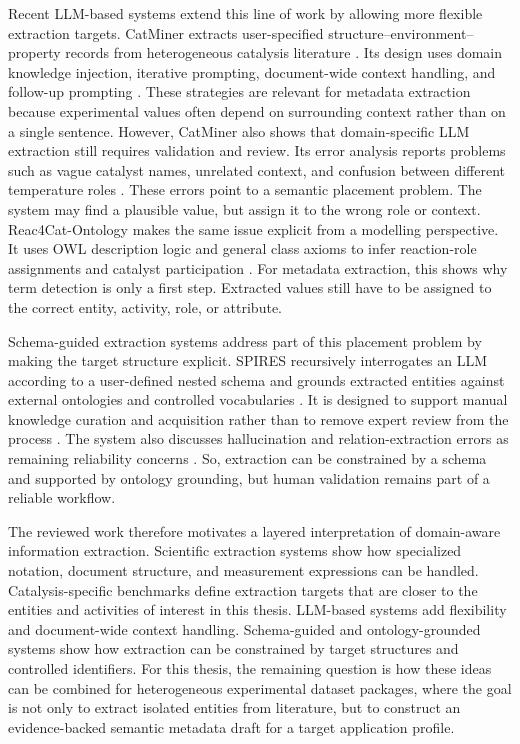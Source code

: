 Recent \ac{LLM}-based systems extend this line of work by allowing more flexible extraction targets.
CatMiner extracts user-specified structure--environment--property records from heterogeneous catalysis literature \cite{walls2025catminer}.
Its design uses domain knowledge injection, iterative prompting, document-wide context handling, and follow-up prompting \cite{walls2025catminer}.
These strategies are relevant for metadata extraction because experimental values often depend on surrounding context rather than on a single sentence.
However, CatMiner also shows that domain-specific \ac{LLM} extraction still requires validation and review.
Its error analysis reports problems such as vague catalyst names, unrelated context, and confusion between different temperature roles \cite{walls2025catminer}.
These errors point to a semantic placement problem.
The system may find a plausible value, but assign it to the wrong role or context.
Reac4Cat-Ontology makes the same issue explicit from a modelling perspective.
It uses \ac{OWL} description logic and general class axioms to infer reaction-role assignments and catalyst participation \cite{behr2024reac4cat}.
For metadata extraction, this shows why term detection is only a first step.
Extracted values still have to be assigned to the correct entity, activity, role, or attribute.

Schema-guided extraction systems address part of this placement problem by making the target structure explicit.
\ac{SPIRES} recursively interrogates an \ac{LLM} according to a user-defined nested schema and grounds extracted entities against external ontologies and controlled vocabularies \cite{caufield2024spires}.
It is designed to support manual knowledge curation and acquisition rather than to remove expert review from the process \cite{caufield2024spires}.
The system also discusses hallucination and relation-extraction errors as remaining reliability concerns \cite{caufield2024spires}.
So, extraction can be constrained by a schema and supported by ontology grounding, but human validation remains part of a reliable workflow.

The reviewed work therefore motivates a layered interpretation of domain-aware information extraction.
Scientific extraction systems show how specialized notation, document structure, and measurement expressions can be handled.
Catalysis-specific benchmarks define extraction targets that are closer to the entities and activities of interest in this thesis.
\ac{LLM}-based systems add flexibility and document-wide context handling.
Schema-guided and ontology-grounded systems show how extraction can be constrained by target structures and controlled identifiers.
For this thesis, the remaining question is how these ideas can be combined for heterogeneous experimental dataset packages, where the goal is not only to extract isolated entities from literature, but to construct an evidence-backed semantic metadata draft for a target application profile.

